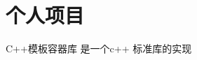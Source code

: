 \documentclass[11pt,a4paper]{moderncv}
\begin{document}
\section{个人项目}
\renewcommand{\baselinestretch}{1.2}

{C++模板容器库}{}{}{}
{是一个c++ 标准库的实现}

\vspace*{0.2\baselineskip}

\vspace*{0.2\baselineskip}

\renewcommand{\baselinestretch}{1.0}
\closesection{}                   %
\renewcommand{\listitemsymbol}{-} %
\end{document}
